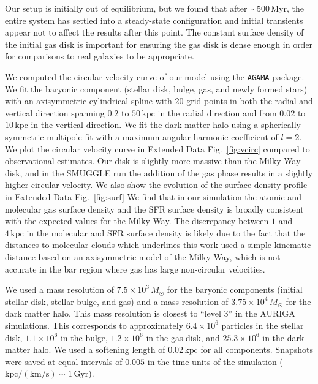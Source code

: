 \documentclass{natureprintstyle}
\begin{document}
Our setup is initially out of equilibrium, but we found that after
$\sim500\,\textrm{Myr}$, the entire system has settled into a steady-state
configuration and initial transients appear not to affect the results after
this point. The constant surface density of the initial gas disk is important
for ensuring the gas disk is dense enough in order for comparisons to real
galaxies to be appropriate.

We computed the circular velocity curve of our model using the \texttt{AGAMA}
package.\cite{2019MNRAS.482.1525V} We fit the baryonic component (stellar
disk, bulge, gas, and newly formed stars) with an axisymmetric cylindrical
spline with $20$ grid points in both the radial and vertical direction
spanning $0.2$ to $50\,\textrm{kpc}$ in the radial direction and from $0.02$
to $10\,\textrm{kpc}$ in the vertical direction. We fit the dark matter halo
using a spherically symmetric multipole fit with a maximum angular harmonic
coefficient of $l=2$. We plot the circular velocity curve in Extended Data
Fig.~\ref{fig:vcirc} compared to observational
estimates.\cite{2019ApJ...871..120E} Our disk is slightly more massive than
the Milky Way disk, and in the SMUGGLE run the addition of the gas phase
results in a slightly higher circular velocity. We also show the evolution of
the surface density profile in Extended Data Fig.~\ref{fig:surf} We find that
in our simulation the atomic and molecular gas surface density and the SFR
surface density is broadly consistent with the expected values for the Milky
Way.\cite{2008AA...487..951K,2022ApJ...929L..18E} The discrepancy between $1$
and $4\,\textrm{kpc}$ in the molecular and SFR surface density is likely due
to the fact that the distances to molecular clouds which underlines this work
used a simple kinematic distance based on an axisymmetric model of the Milky
Way,\cite{2017ApJ...834...57M} which is not accurate in the bar region
where gas has large non-circular velocities.

We used a mass resolution of $7.5\times10^3\,M_{\odot}$ for the baryonic
components (initial stellar disk, stellar bulge, and gas) and a mass
resolution of $3.75\times10^4\,M_{\odot}$ for the dark matter halo. This mass
resolution is closest to ``level 3'' in the AURIGA
simulations.\cite{2017MNRAS.467..179G} This corresponds to approximately
$6.4\times10^6$ particles in the stellar disk, $1.1\times10^6$ in the bulge,
$1.2\times10^6$ in the gas disk, and $25.3\times10^6$ in the dark matter halo.
We used a softening length of $0.02\,\textrm{kpc}$ for all components.
Snapshots were saved at equal intervals of $0.005$ in the time units of the
simulation ($\textrm{kpc}/(\textrm{km}/\textrm{s})\sim1\,\textrm{Gyr}$).
\end{document}

